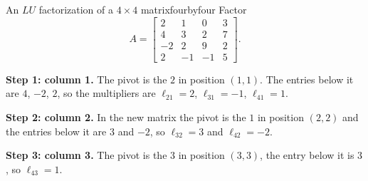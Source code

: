 \documentclass[11pt]{article}
\begin{document}
\begin{exmp}{An $LU$ factorization of a $4\times4$ matrix}{fourbyfour}
Factor
\[
A=\begin{bmatrix}2&1&0&3\\4&3&2&7\\-2&2&9&2\\2&-1&-1&5\end{bmatrix}.
\]

\textbf{Step 1: column 1.} The pivot is the $2$ in position $(1,1)$. The entries below it are $4$, $-2$, $2$, so the multipliers are $\ell_{21}=2$, $\ell_{31}=-1$, $\ell_{41}=1$.

\textbf{Step 2: column 2.} In the new matrix the pivot is the $1$ in position $(2,2)$ and the entries below it are $3$ and $-2$, so $\ell_{32}=3$ and $\ell_{42}=-2$.

\textbf{Step 3: column 3.} The pivot is the $3$ in position $(3,3)$, the entry below it is $3$, so $\ell_{43}=1$.


\end{exmp}
\end{document}
